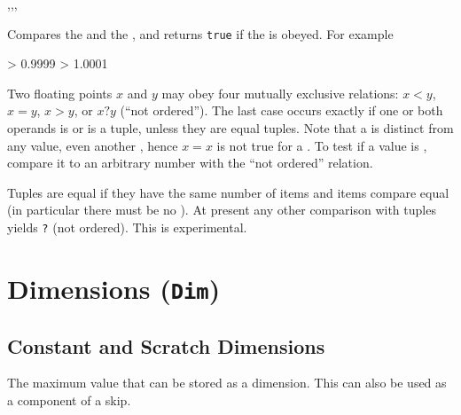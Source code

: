 \documentclass[oneside]{book}
\begin{document}
\begin{function}{\FpCompare,\FpCompareT,\FpCompareF,\FpCompareTF}
\begin{syntax}
   
    
    
     
\end{syntax}
Compares the  and the , and returns
\texttt{true} if the  is obeyed. For example
\begin{demohigh}
 > {0.9999} {} {}
 > {1.0001} {} {}
\end{demohigh}
Two floating points
$x$ and $y$ may obey four mutually exclusive relations:
$x<y$, $x=y$, $x>y$, or $x?y$ (\enquote{not ordered}).  The last
case occurs exactly if one or both operands is \nan{} or is a tuple,
unless they are equal tuples.  Note that a \nan{} is distinct from
any value, even another \nan{}, hence $x=x$ is not true for
a \nan{}.  To test if a value is \nan{}, compare it to an arbitrary
number with the \enquote{not ordered} relation.\par
Tuples are equal if they have the same number of items and items
compare equal (in particular there must be no \nan{}).
At present any other comparison with tuples yields \verb|?| (not ordered).
This is experimental.
\end{function}

\chapter{Dimensions (\texttt{Dim})}

\section{Constant and Scratch Dimensions}

\begin{variable}{\cMaxDim}
The maximum value that can be stored as a dimension.  This can also
be used as a component of a skip.
\end{variable}
\end{document}
